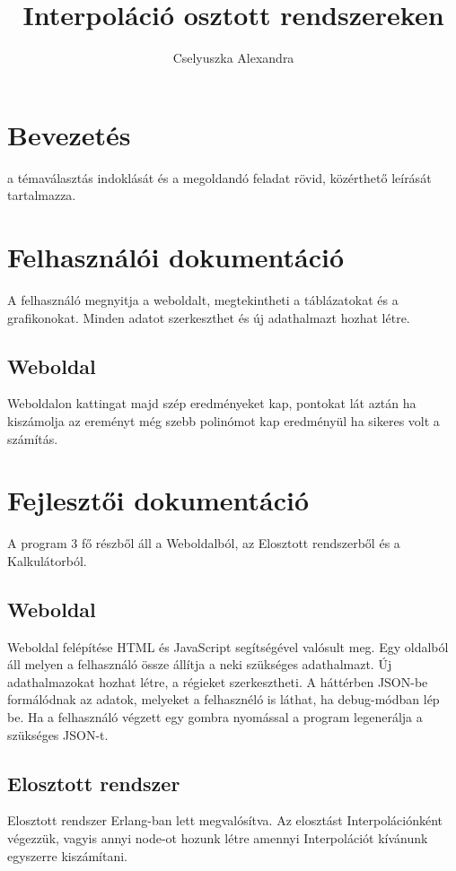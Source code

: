 \documentclass{elteikthesis}
\title{Interpoláció osztott rendszereken}
\author{Cselyuszka Alexandra}
\begin{document}
\frontmatter

	\maketitle
	\tableofcontents
	
\mainmatter

\chapter{Bevezetés} 
a témaválasztás indoklását és a megoldandó feladat rövid, közérthető leírását
tartalmazza.

\chapter{Felhasználói dokumentáció}
A felhasználó megnyitja a weboldalt, megtekintheti a táblázatokat és a grafikonokat. Minden adatot szerkeszthet és új adathalmazt hozhat létre.

\section{Weboldal}
Weboldalon kattingat majd szép eredményeket kap, pontokat lát aztán ha kiszámolja az ereményt még szebb polinómot kap eredményül ha sikeres volt a számítás.

\chapter{Fejlesztői dokumentáció}
A program 3 fő részből áll a Weboldalból, az Elosztott rendszerből és a Kalkulátorból.

\section{Weboldal}
Weboldal felépítése HTML és JavaScript segítségével valósult meg. Egy oldalból áll melyen a felhasználó össze állítja a neki szükséges adathalmazt. Új adathalmazokat hozhat létre, a régieket szerkesztheti. A háttérben JSON-be formálódnak az adatok, melyeket a felhasznéló is láthat, ha debug-módban lép be. 
Ha a felhasználó végzett egy gombra nyomással a program legenerálja a szükséges JSON-t. 

\section{Elosztott rendszer}
Elosztott rendszer Erlang-ban lett megvalósítva. Az elosztást Interpolációnként végezzük, vagyis annyi node-ot hozunk létre amennyi Interpolációt kívánunk egyszerre kiszámítani.
\end{document}
